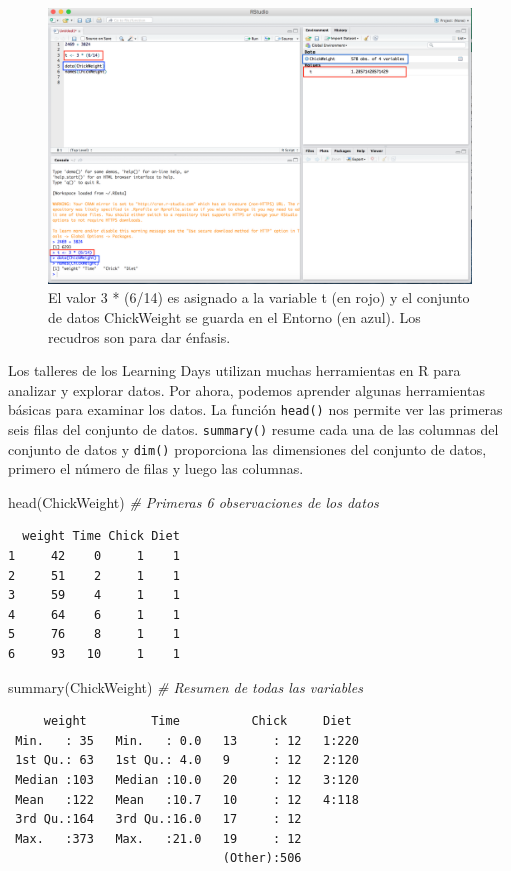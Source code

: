 \documentclass[
  12pt,
  spanish,
]{book}
\newenvironment{Shaded}{\begin{snugshade}}{\end{snugshade}}
\newcommand{\CommentTok}[1]{\textcolor[rgb]{0.56,0.35,0.01}{\textit{#1}}}
\newcommand{\FunctionTok}[1]{\textcolor[rgb]{0.00,0.00,0.00}{#1}}
\newcommand{\NormalTok}[1]{#1}
\begin{document}
\begin{figure}
\includegraphics[width=0.6\linewidth]{Images/save_data} \caption{El valor 3 * (6/14) es asignado a la variable t (en rojo) y el conjunto de datos ChickWeight se guarda en el Entorno (en azul). Los recudros son para dar énfasis.}\label{fig:savedata}
\end{figure}

Los talleres de los Learning Days utilizan muchas herramientas en R para analizar y explorar datos. Por ahora, podemos aprender algunas herramientas básicas para examinar los datos. La función \texttt{head()} nos permite ver las primeras seis filas del conjunto de datos. \texttt{summary()} resume cada una de las columnas del conjunto de datos y \texttt{dim()} proporciona las dimensiones del conjunto de datos, primero el número de filas y luego las columnas.

\begin{Shaded}
\begin{Highlighting}[]
\FunctionTok{head}\NormalTok{(ChickWeight) }\CommentTok{\# Primeras 6 observaciones de los datos}
\end{Highlighting}
\end{Shaded}

\begin{verbatim}
  weight Time Chick Diet
1     42    0     1    1
2     51    2     1    1
3     59    4     1    1
4     64    6     1    1
5     76    8     1    1
6     93   10     1    1
\end{verbatim}

\begin{Shaded}
\begin{Highlighting}[]
\FunctionTok{summary}\NormalTok{(ChickWeight) }\CommentTok{\# Resumen de todas las variables}
\end{Highlighting}
\end{Shaded}

\begin{verbatim}
     weight         Time          Chick     Diet   
 Min.   : 35   Min.   : 0.0   13     : 12   1:220  
 1st Qu.: 63   1st Qu.: 4.0   9      : 12   2:120  
 Median :103   Median :10.0   20     : 12   3:120  
 Mean   :122   Mean   :10.7   10     : 12   4:118  
 3rd Qu.:164   3rd Qu.:16.0   17     : 12          
 Max.   :373   Max.   :21.0   19     : 12          
                              (Other):506          
\end{verbatim}
\end{document}
